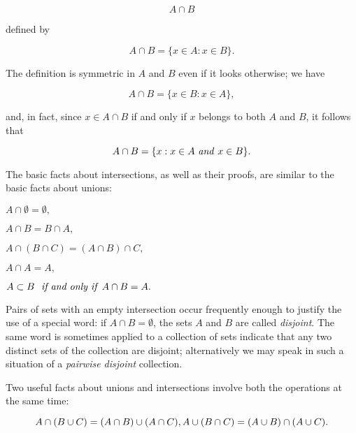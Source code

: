 \begin{equation*}
A \cap B
\end{equation*}

defined by 

\begin{equation*}
A \cap B = \{ x \in A: x \in B \}.
\end{equation*}

The definition is symmetric in $A$ and $B$ even if it looks otherwise; we have 

\begin{equation*}
A \cap B = \{ x \in B: x \in A \},
\end{equation*}

and, in fact, since $x \in A \cap B$ if and only if $x$ belongs to both $A$ and $B$, it follows that 

\begin{equation*}
A \cap B = \{x: x \in A \text{ \textit{and} } x \in B \}.
\end{equation*}

The basic facts about intersections, as well as their proofs, are similar to the basic facts about unions:

\begin{center}
$A \cap \emptyset = \emptyset ,$

$ A \cap B =  B \cap A,$

$A \cap (B \cap C) = (A \cap B) \cap C,$

$A \cap A = A,$

$A \subset B \text{ \textit{ if and only if} } A \cap B = A.$
\end{center}

Pairs of sets with an empty intersection occur frequently enough to justify the use of a special word: if $A \cap B =  \emptyset $, the sets $A$ and $B$ are called \textit{disjoint}. The same word is sometimes applied to a collection of sets indicate that any two distinct sets of the collection are disjoint; alternatively we may speak in such a situation of a \textit{pairwise disjoint} collection.
 
Two useful facts about unions and intersections involve both the operations at the same time: 

\begin{equation*}
A \cap (B \cup C) = (A \cap B) \cup (A \cap C),\\
A \cup (B \cap C) = (A \cup B) \cap (A \cup C).\\
\end{equation*}

